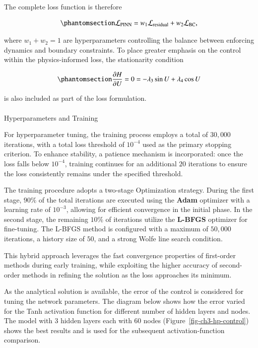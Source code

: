 \documentclass[
  number,
  preprint]{elsarticle}
\makeatletter
\let\oldparagraph\paragraph
\renewcommand{\paragraph}{
    \@ifstar
      \xxxParagraphStar
      \xxxParagraphNoStar
  }
\newcommand{\xxxParagraphStar}[1]{\oldparagraph*{#1}\mbox{}}
\newcommand{\xxxParagraphNoStar}[1]{\oldparagraph{#1}\mbox{}}
\makeatother
\begin{document}
The complete loss function is therefore

\begin{equation}\protect\phantomsection\label{eq-ch3-lts-total-loss}{
\mathcal{L}_{\text{PINN}} = w_1 \mathcal{L}_{\text{residual}} + w_2 \mathcal{L}_{\text{BC}},
}\end{equation}

where \(w_1 + w_2 = 1\) are hyperparameters controlling the balance
between enforcing dynamics and boundary constraints. To place greater
emphasis on the control within the physics-informed loss, the
stationarity condition

\begin{equation}\protect\phantomsection\label{eq-ch3-lts-control-loss}{
\frac{\partial H}{\partial U} = 0 = -\lambda_3 \sin U + \lambda_4 \cos U
}\end{equation}

is also included as part of the loss formulation.

\paragraph{Hyperparameters and
Training}\label{hyperparameters-and-training}

For hyperparameter tuning, the training process employs a total of
\(30{,}000\) iterations, with a total loss threshold of \(10^{-4}\) used
as the primary stopping criterion. To enhance stability, a patience
mechanism \citep{sanchez2018real} is incorporated: once the loss falls
below \(10^{-4}\), training continues for an additional \(20\)
iterations to ensure the loss consistently remains under the specified
threshold.

The training procedure adopts a two-stage Optimization strategy. During
the first stage, \(90\%\) of the total iterations are executed using the
\textbf{Adam} optimizer with a learning rate of \(10^{-3}\), allowing
for efficient convergence in the initial phase. In the second stage, the
remaining \(10\%\) of iterations utilize the \textbf{L-BFGS} optimizer
for fine-tuning. The L-BFGS method is configured with a maximum of
\(50{,}000\) iterations, a history size of \(50\), and a strong Wolfe
line search condition.

This hybrid approach leverages the fast convergence properties of
first-order methods during early training, while exploiting the higher
accuracy of second-order methods in refining the solution as the loss
approaches its minimum.

As the analytical solution is available, the error of the control is
considered for tuning the network parameters. The diagram below shows
how the error varied for the Tanh activation function for different
number of hidden layers and nodes. The model with 3 hidden layers each
with 60 nodes (Figure~\ref{fig-ch3-hp-control}) shows the best results
and is used for the subsequent activation-function comparison.
\end{document}
